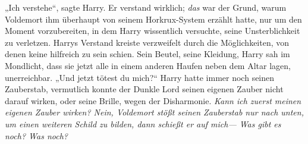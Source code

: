 „Ich verstehe“, sagte Harry.
Er verstand wirklich; \emph{das} war der Grund, warum Voldemort ihm überhaupt von seinem Horkrux-System erzählt hatte, nur um den Moment vorzubereiten, in dem Harry wissentlich versuchte, seine Unsterblichkeit zu verletzen. Harrys Verstand kreiste verzweifelt durch die Möglichkeiten, von denen keine hilfreich zu sein schien. Sein Beutel, seine Kleidung, Harry sah im Mondlicht, dass sie jetzt alle in einem anderen Haufen neben dem Altar lagen, unerreichbar.
„Und jetzt tötest du mich?“
Harry hatte immer noch seinen Zauberstab, vermutlich konnte der Dunkle Lord seinen eigenen Zauber nicht darauf wirken, oder seine Brille, wegen der Disharmonie.
\emph{Kann ich zuerst meinen eigenen Zauber wirken? Nein, Voldemort stößt seinen Zauberstab nur nach unten, um einen weiteren Schild zu bilden, dann schießt er auf mich— Was gibt es noch? \emph{Was noch?}}

